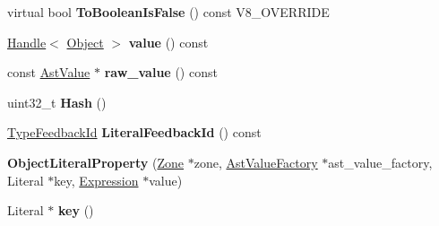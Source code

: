 \begin{DoxyCompactItemize}
\item 
\hypertarget{classv8_1_1internal_1_1_v8___f_i_n_a_l_aa3affa9ac559b1fecfa74d074cada1ff}{}virtual bool {\bfseries To\+Boolean\+Is\+False} () const V8\+\_\+\+O\+V\+E\+R\+R\+I\+D\+E\label{classv8_1_1internal_1_1_v8___f_i_n_a_l_aa3affa9ac559b1fecfa74d074cada1ff}

\item 
\hypertarget{classv8_1_1internal_1_1_v8___f_i_n_a_l_a5b927f107fb31fce949823623e952384}{}\hyperlink{classv8_1_1internal_1_1_handle}{Handle}$<$ \hyperlink{classv8_1_1internal_1_1_object}{Object} $>$ {\bfseries value} () const \label{classv8_1_1internal_1_1_v8___f_i_n_a_l_a5b927f107fb31fce949823623e952384}

\item 
\hypertarget{classv8_1_1internal_1_1_v8___f_i_n_a_l_ab4720e50a1dc094ac0ace768f015b9d2}{}const \hyperlink{classv8_1_1internal_1_1_ast_value}{Ast\+Value} $\ast$ {\bfseries raw\+\_\+value} () const \label{classv8_1_1internal_1_1_v8___f_i_n_a_l_ab4720e50a1dc094ac0ace768f015b9d2}

\item 
\hypertarget{classv8_1_1internal_1_1_v8___f_i_n_a_l_abf22b735250c7e8d764b8c8b928150a2}{}uint32\+\_\+t {\bfseries Hash} ()\label{classv8_1_1internal_1_1_v8___f_i_n_a_l_abf22b735250c7e8d764b8c8b928150a2}

\item 
\hypertarget{classv8_1_1internal_1_1_v8___f_i_n_a_l_abb8a4790efabb12a6220ace69bcbaa63}{}\hyperlink{classv8_1_1internal_1_1_type_feedback_id}{Type\+Feedback\+Id} {\bfseries Literal\+Feedback\+Id} () const \label{classv8_1_1internal_1_1_v8___f_i_n_a_l_abb8a4790efabb12a6220ace69bcbaa63}

\item 
\hypertarget{classv8_1_1internal_1_1_v8___f_i_n_a_l_a1a22ebccc3d5662d1f04b906bbfb3dad}{}{\bfseries Object\+Literal\+Property} (\hyperlink{classv8_1_1internal_1_1_zone}{Zone} $\ast$zone, \hyperlink{classv8_1_1internal_1_1_ast_value_factory}{Ast\+Value\+Factory} $\ast$ast\+\_\+value\+\_\+factory, Literal $\ast$key, \hyperlink{classv8_1_1internal_1_1_expression}{Expression} $\ast$value)\label{classv8_1_1internal_1_1_v8___f_i_n_a_l_a1a22ebccc3d5662d1f04b906bbfb3dad}

\item 
\hypertarget{classv8_1_1internal_1_1_v8___f_i_n_a_l_a5964a9e7426518248e318cf72f475820}{}Literal $\ast$ {\bfseries key} ()\label{classv8_1_1internal_1_1_v8___f_i_n_a_l_a5964a9e7426518248e318cf72f475820}


\end{DoxyCompactItemize}
